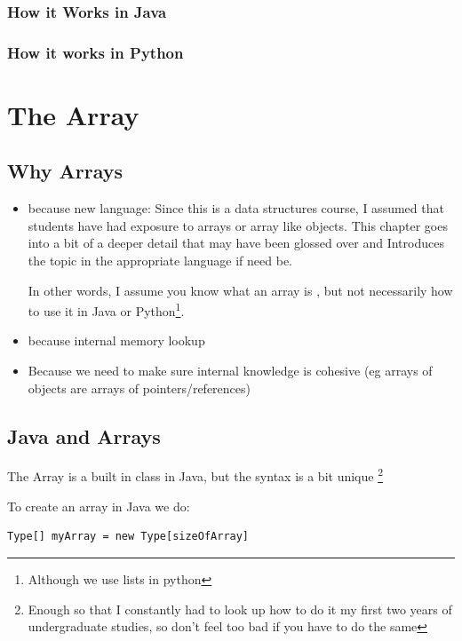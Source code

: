 \documentclass[10pt,a4paper]{book}
\begin{document}
\subsection{How it Works in Java}

\subsection{How it works in Python}


\chapter{The Array}

\section{Why Arrays}

\begin{itemize}
	\item because new language: 
	Since this is a data structures course, I assumed that students have had exposure to arrays or array like objects.
	This chapter goes into a bit of a deeper detail that may have been glossed over and Introduces the topic in the appropriate language if need be.
	
	In other words, I assume you know what an array is , but not necessarily how to use it in Java or Python\footnote{Although we use lists in python}.
	\item  because internal memory lookup
	\item Because we need to make sure internal knowledge is cohesive (eg arrays of objects are arrays of pointers/references)
\end{itemize}







\section{Java and Arrays}
The Array is a built in class in Java, but the syntax is a bit unique \footnote{Enough so that I constantly had to look up how to do it my first two years of undergraduate studies, so don't feel too bad if you have to do the same}

To create an array in Java we do:

\begin{verbatim}
Type[] myArray = new Type[sizeOfArray]
\end{verbatim}
\end{document}
